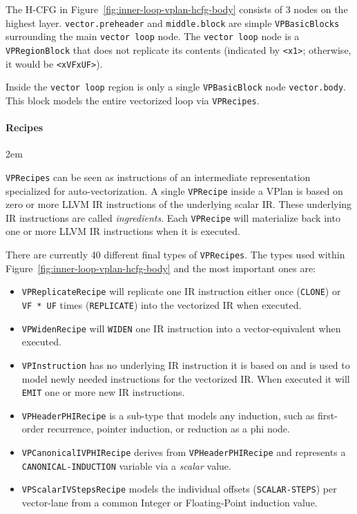 \documentclass[sigplan,11pt,nonacm]{acmart}
\begin{document}
The H-CFG in Figure~\ref{fig:inner-loop-vplan-hcfg-body} consists of 3 nodes on the highest layer. 
\texttt{vector.preheader} and \texttt{middle.block} 
are simple \texttt{VPBasicBlocks} surrounding the main \texttt{vector loop} node. The \texttt{vector loop} node 
is a \texttt{VPRegionBlock} that does 
not replicate its contents (indicated by \texttt{<x1>}; otherwise, it would be \texttt{<xVFxUF>}).

Inside the \texttt{vector loop} region is only a single \texttt{VPBasicBlock} node \texttt{vector.body}. This block 
models the entire vectorized loop via \texttt{VPRecipes}.

\paragraph{Recipes}
\emergencystretch 2em

\texttt{VPRecipes} can be seen as instructions of an intermediate representation specialized for auto-vectorization. 
A single \texttt{VPRecipe} inside a VPlan is based on zero or more LLVM IR instructions 
of the underlying scalar IR. These underlying IR instructions are called \textit{ingredients}. 
Each \texttt{VPRecipe} will materialize back into one or more LLVM IR instructions when it is executed.

There are currently 40 different final types of \texttt{VPRecipes}. The types used 
within Figure~\ref{fig:inner-loop-vplan-hcfg-body} and the most important ones are:
\begin{itemize}
  \item \texttt{VPReplicateRecipe} will replicate one IR instruction either once (\texttt{CLONE})
  or \texttt{VF * UF} times (\texttt{REPLICATE}) into the vectorized IR when executed.
  \item \texttt{VPWidenRecipe} will \texttt{WIDEN} one IR instruction into a
  vector-equivalent when executed.
  \item \texttt{VPInstruction} has no underlying IR instruction it is based on and is used 
  to model newly needed instructions for the vectorized IR. When executed it will 
  \texttt{EMIT} one or more new IR instructions.
  \item \texttt{VPHeaderPHIRecipe} is a sub-type that models any induction, such as first-order 
  recurrence, pointer induction, or reduction as a phi node.
  \item \texttt{VPCanonicalIVPHIRecipe} derives from \texttt{VPHeaderPHIRecipe} and represents a 
  \texttt{CANONICAL-INDUCTION} variable via a \textit{scalar} value.
  \item \texttt{VPScalarIVStepsRecipe} models the individual offsets (\texttt{SCALAR-STEPS}) per 
  vector-lane from a common Integer or Floating-Point induction value.
\end{itemize}
\end{document}
